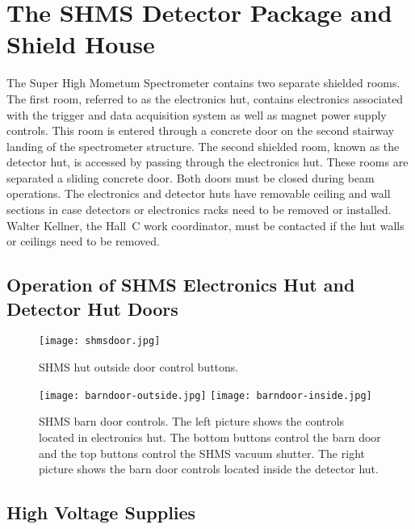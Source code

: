 
\section{The SHMS Detector Package and Shield House }

The Super High Mometum Spectrometer contains two separate shielded
rooms.  The first room, referred to as the electronics hut, contains
electronics associated with the trigger and data acquisition system as
well as magnet power supply controls.    This room is entered through a concrete
door on the second stairway landing of the spectrometer structure.
The second shielded room, known as the detector hut, is accessed by
passing through the electronics hut.  These rooms are separated a
sliding concrete door.  Both doors must be closed during beam
operations.  The electronics and detector huts have removable ceiling
and wall sections in case detectors or electronics racks need to be
removed or installed.  Walter Kellner, the Hall~C work coordinator,  
must be contacted if the hut walls or ceilings need to be removed.

\subsection{Operation of SHMS Electronics Hut and Detector Hut Doors}

\begin{figure}
\begin{center}
\texttt{[image: shmsdoor.jpg]}
\caption{\label{fig:shmsdoorcontrol}SHMS hut outside door control buttons.}
\end{center}
\end{figure}

\begin{figure}
\begin{center}
\texttt{[image: barndoor-outside.jpg]}
\texttt{[image: barndoor-inside.jpg]}
\caption{\label{fig:barndoorcontrol}SHMS barn door controls.  The left
  picture shows the controls located in electronics hut.  The bottom
  buttons control the barn door and the top buttons control the SHMS
  vacuum shutter.  The right picture shows the barn door controls
  located inside the detector hut.}
\end{center}
\end{figure}


\subsection{High Voltage Supplies}

